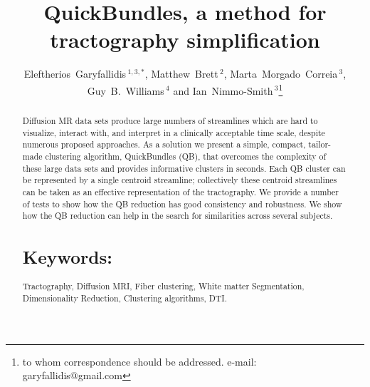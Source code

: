 \documentclass{bioinfo}
\begin{document}

\title[QuickBundles]{QuickBundles, a method for tractography simplification}

\author[Garyfallidis, Brett, Correia, Williams and
Nimmo-Smith]{Eleftherios~Garyfallidis\,$^{1,3,*}$, Matthew~Brett\,$^{2}$,
  Marta~Morgado~Correia\,$^{3}$, Guy~B.~Williams\,$^{4}$ and
  Ian~Nimmo-Smith\,$^{3}$\footnote{to whom correspondence should be
    addressed. e-mail: garyfallidis@gmail.com}}

\address{\,$^{1}$Wolfson College, University of Cambridge, Cambridge, UK\\
  \,$^{2}$University of California, Henry H. Wheeler, Jr. Brain Imaging Center, Berkeley, CA.\\
  \,$^{3}$MRC Cognition and Brain Sciences Unit, Cambridge, UK.\\
  \,$^{4}$Wolfson Brain Imaging Centre, University of Cambridge,
  Cambridge, UK.}


\history{}

\editor{}

\maketitle

\begin{abstract}
\noindent
Diffusion MR data sets produce large numbers of streamlines which
are hard to visualize, interact with, and interpret in a clinically
acceptable time scale, despite numerous proposed approaches. As a
solution we present a simple, compact, tailor-made clustering algorithm,
QuickBundles (QB), that overcomes the complexity of these large data
sets and provides informative clusters in seconds. Each QB cluster can
be represented by a single centroid streamline; collectively these
centroid streamlines can be taken as an effective representation of the
tractography. We provide a number of tests to show how the QB reduction
has good consistency and robustness. We show how the QB reduction can
help in the search for similarities across several subjects.

\section{Keywords:} Tractography, Diffusion MRI, Fiber clustering, White
matter Segmentation, Dimensionality Reduction, Clustering algorithms, DTI.

\end{abstract}
\end{document}
